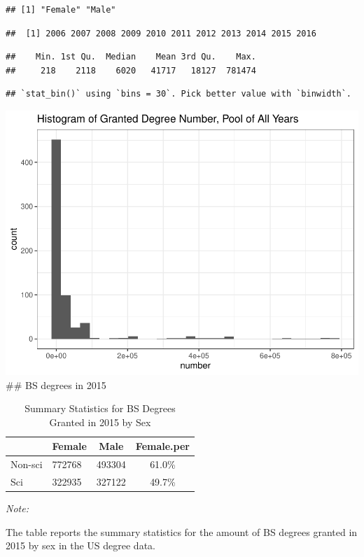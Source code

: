 \documentclass[
  12pt,
]{article}
\begin{document}
\begin{verbatim}
## [1] "Female" "Male"
\end{verbatim}

\begin{verbatim}
##  [1] 2006 2007 2008 2009 2010 2011 2012 2013 2014 2015 2016
\end{verbatim}

\begin{verbatim}
##    Min. 1st Qu.  Median    Mean 3rd Qu.    Max. 
##     218    2118    6020   41717   18127  781474
\end{verbatim}

\begin{verbatim}
## `stat_bin()` using `bins = 30`. Pick better value with `binwidth`.
\end{verbatim}

\includegraphics{hw1_sol_files/figure-latex/unnamed-chunk-8-1.pdf} \#\#
BS degrees in 2015

\begin{table}[H]

\caption{\label{tab:unnamed-chunk-9}Summary Statistics for BS Degrees Granted in 2015 by Sex}
\centering
\begin{threeparttable}
\begin{tabular}[t]{llcc}
\toprule
  & Female & Male & Female.per\\
\midrule
Non-sci & 772768 & 493304 & 61.0\%\\
Sci & 322935 & 327122 & 49.7\%\\
\bottomrule
\end{tabular}
\begin{tablenotes}
\item \textit{Note: } 
\item The table reports the summary statistics for the amount of BS degrees granted in 2015 by sex in the US degree data.
\end{tablenotes}
\end{threeparttable}
\end{table}
\end{document}
